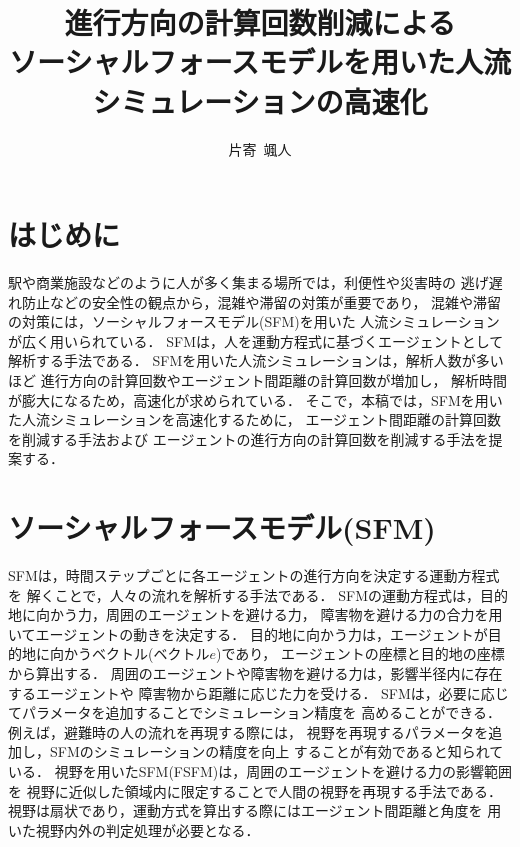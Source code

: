 \documentclass{maelab_y}
\begin{document}
\title{進行方向の計算回数削減による\\ソーシャルフォースモデルを用いた人流シミュレーションの高速化}
\author{片寄\ 颯人}
\maketitle

\section{はじめに}
駅や商業施設などのように人が多く集まる場所では，利便性や災害時の
逃げ遅れ防止などの安全性の観点から，混雑や滞留の対策が重要であり，
混雑や滞留の対策には，ソーシャルフォースモデル(SFM)を用いた
人流シミュレーションが広く用いられている\cite{helbing_sfm}．
SFMは，人を運動方程式に基づくエージェントとして解析する手法である．
SFMを用いた人流シミュレーションは，解析人数が多いほど	
進行方向の計算回数やエージェント間距離の計算回数が増加し，
解析時間が膨大になるため，高速化が求められている．
そこで，本稿では，SFMを用いた人流シミュレーションを高速化するために，
エージェント間距離の計算回数を削減する手法および
エージェントの進行方向の計算回数を削減する手法を提案する．

\section{ソーシャルフォースモデル(SFM)}
SFMは，時間ステップごとに各エージェントの進行方向を決定する運動方程式を
解くことで，人々の流れを解析する手法である．
SFMの運動方程式は，目的地に向かう力，周囲のエージェントを避ける力，
障害物を避ける力の合力を用いてエージェントの動きを決定する．
目的地に向かう力は，エージェントが目的地に向かうベクトル(ベクトル$e$)であり，
エージェントの座標と目的地の座標から算出する．
周囲のエージェントや障害物を避ける力は，影響半径内に存在するエージェントや
障害物から距離に応じた力を受ける．
SFMは，必要に応じてパラメータを追加することでシミュレーション精度を
高めることができる．例えば，避難時の人の流れを再現する際には，
視野を再現するパラメータを追加し，SFMのシミュレーションの精度を向上
することが有効であると知られている\cite{21_Isozaki}．
視野を用いたSFM(FSFM)は，周囲のエージェントを避ける力の影響範囲を
視野に近似した領域内に限定することで人間の視野を再現する手法である．
視野は扇状であり，運動方式を算出する際にはエージェント間距離と角度を
用いた視野内外の判定処理が必要となる．
\end{document}
